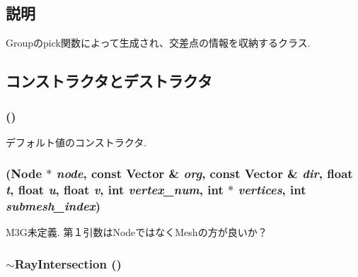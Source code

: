 \subsection{説明}
Groupのpick関数によって生成され、交差点の情報を収納するクラス. 

\subsection{コンストラクタとデストラクタ}
\hypertarget{classm3g_1_1RayIntersection_242b33a79f98ed90ad5a36912d2a46d5}{
\subsubsection[{RayIntersection}]{ ()}}
\label{classm3g_1_1RayIntersection_242b33a79f98ed90ad5a36912d2a46d5}


デフォルト値のコンストラクタ. \hypertarget{classm3g_1_1RayIntersection_c7d946885706d0cefed30d9ee257a771}{
\subsubsection[{RayIntersection}]{ ({\bf Node} $\ast$ {\em node}, \/  const {\bf Vector} \& {\em org}, \/  const {\bf Vector} \& {\em dir}, \/  float {\em t}, \/  float {\em u}, \/  float {\em v}, \/  int {\em vertex\_\-num}, \/  int $\ast$ {\em vertices}, \/  int {\em submesh\_\-index})}}
\label{classm3g_1_1RayIntersection_c7d946885706d0cefed30d9ee257a771}


M3G未定義. 第１引数はNodeではなくMeshの方が良いか？ \hypertarget{classm3g_1_1RayIntersection_bf9eb45cc9ff31acd542bb0da1b46fe1}{
\subsubsection[{$\sim$RayIntersection}]{\setlength{\rightskip}{0pt plus 5cm}$\sim${\bf RayIntersection} ()}}
\label{classm3g_1_1RayIntersection_bf9eb45cc9ff31acd542bb0da1b46fe1}


